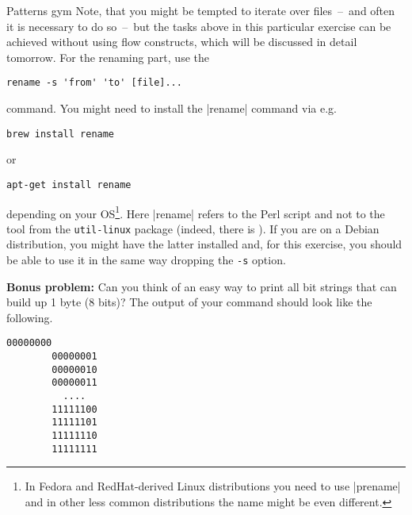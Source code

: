 \begin{exercise}[Inspirational]{Patterns gym}
    Note, that you might be tempted to iterate over files~--~and often it is necessary to do so~--~but the tasks above in this particular exercise can be achieved without using flow constructs, which will be discussed in detail tomorrow.
    For the renaming part, use the
    \begin{lstlisting}[style=MyBash]
        rename -s 'from' 'to' [file]...
    \end{lstlisting}
    command.
    You might need to install the \bash|rename| command via e.g.
    \begin{lstlisting}[style=MyBash, emph={[6]{brew}}]
        brew install rename
    \end{lstlisting}
    or
    \begin{lstlisting}[style=MyBash, emph={[6]{apt-get}}, alsoletter={-}]
        apt-get install rename
    \end{lstlisting}
    depending on your OS\footnote{In Fedora and RedHat-derived Linux distributions you need to use \bash|prename| and in other less common distributions the name might be even different.}.
    Here \bash|rename| refers to the Perl script and not to the tool from the \texttt{util-linux} package (indeed, there is ).
    If you are on a Debian distribution, you might have the latter installed and, for this exercise, you should be able to use it in the same way dropping the \texttt{-s} option.

    \vspace{5mm}
    \textbf{Bonus problem:} Can you think of an easy way to print all bit strings that can build up 1 byte (8 bits)?
    The output of your command should look like the following.
    \begin{lstlisting}[style=MyBash]
        00000000
        00000001
        00000010
        00000011
          ....
        11111100
        11111101
        11111110
        11111111
    \end{lstlisting}
    \vspace{5mm}
\end{exercise}